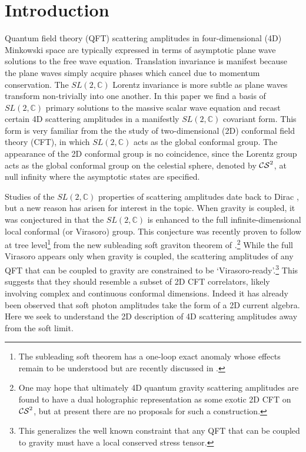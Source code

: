 \documentclass[12pt]{article}
\def\cst{${\cal CS}^2$}
\numberwithin{equation}{section}
\begin{document}
\eject
\tableofcontents

\section{Introduction}

Quantum field theory (QFT) scattering amplitudes in four-dimensional (4D) Minkowski space are typically expressed in terms of asymptotic plane wave solutions to the free wave equation. Translation invariance is manifest because the plane waves simply acquire phases which cancel due to momentum conservation. The $SL(2,\mathbb{C})$ Lorentz invariance is more subtle as plane waves transform non-trivially into one another. 
In this paper we find a basis of $SL(2,\mathbb{C})$ primary solutions to the massive scalar wave equation  and recast certain  4D scattering amplitudes in a manifestly $SL(2,\mathbb{C})$ covariant form. This form is very familiar from the the study of two-dimensional (2D) conformal field theory (CFT), in which $SL(2,\mathbb{C})$ acts as the global conformal group. The appearance of the 2D conformal group is no coincidence, since the Lorentz group  acts as the global conformal group on the celestial sphere, denoted by \cst, at null infinity where the asymptotic states are specified. 

Studies of the $SL(2,\mathbb{C})$ properties of scattering amplitudes date back to Dirac \cite{Dirac:1936fq}, but a new reason has arisen for interest in the topic. When gravity is coupled, it was conjectured in \cite{deBoer:2003vf,Banks:2003vp,Barnich:2009se,Barnich:2011ct} that the $SL(2,\mathbb{C})$ is enhanced to the full infinite-dimensional  
local conformal (or Virasoro)  group.  This conjecture was recently proven \cite{Kapec:2014opa,Kapec:2016jld,Cheung:2016iub} to follow at tree level\footnote{The subleading soft theorem has a one-loop exact anomaly \cite{He:2014bga,Bianchi:2014gla,Bern:2014oka,Bern:2014vva}  whose effects remain to be understood  but are recently discussed in \cite{Hawking:2016sgy,loop}.} from the new subleading soft graviton theorem of \cite{Cachazo:2014fwa}.\footnote{One may hope that ultimately 4D quantum gravity scattering amplitudes are found to have a dual holographic representation as some exotic 2D CFT on \cst, but at present there are no proposals for such a construction.} While the full Virasoro appears only when gravity is coupled, the scattering amplitudes of any QFT that  can be 
coupled to gravity are constrained to be `Virasoro-ready'.\footnote{This generalizes the well known constraint that any QFT that can be coupled to gravity must have a local conserved stress tensor.} This suggests that they should resemble  a subset of 2D CFT correlators, likely involving complex and continuous conformal dimensions. 
Indeed it has already been observed \cite{Strominger:2013lka,He:2015zea}  that soft photon amplitudes take the form of a 2D current algebra. Here we seek to understand the 2D description of 4D scattering amplitudes away from the soft limit. 
\end{document}
